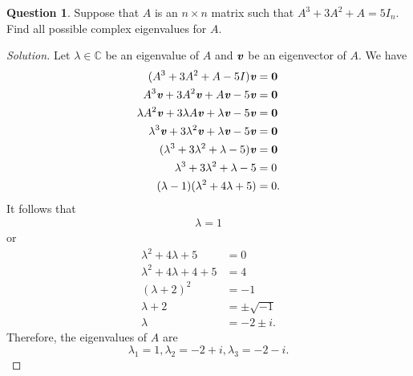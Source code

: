 \documentclass{article}
\newcommand{\C}{\mathbb{C}}
\theoremstyle{definition}
\newtheorem{question}{Question}
\newcommand{\vt}[1]{\textbf{\textit{#1}}}
\newcommand{\0}{\textbf{0}}
\begin{document}
\vspace{.75cm}

\label{Question 4}


\begin{question} Suppose that $A$ is an $n\times n$ matrix such that $A^3 + 3A^2 + A = 5I_n$. Find all possible complex eigenvalues for $A$.

\begin{proof}[Solution]
    Let \(\lambda\in\C\) be an eigenvalue of \(A\) and \(\vt{v}\) be an eigenvector of \(A\).
    We have
    \begin{align*}
        (A^3+3A^2+A-5I)\vt{v} &= \0 \\
        A^3\vt{v}+3A^2\vt{v}+A\vt{v}-5\vt{v} &= \0 \\
        \lambda A^2\vt{v}+3\lambda A\vt{v}+\lambda\vt{v}-5\vt{v} &= \0 \\
        \lambda^3\vt{v}+3\lambda^2\vt{v}+\lambda\vt{v}-5\vt{v} &= \0 \\
        (\lambda^3+3\lambda^2+\lambda-5)\vt{v} &= \0 \\
        \lambda^3+3\lambda^2+\lambda-5 &= 0 \\
        (\lambda-1)(\lambda^2+4\lambda+5) &= 0.
    \end{align*} It follows that
    \begin{align*}
        \lambda = 1
    \end{align*} or
    \begin{align*}
        \lambda^2+4\lambda+5 &= 0 \\
        \lambda^2+4\lambda+4+5 &= 4 \\
        (\lambda+2)^2 &= -1 \\
        \lambda+2 &= \pm\sqrt{-1} \\
        \lambda &= -2\pm i.
    \end{align*}
    Therefore, the eigenvalues of \(A\) are
    \[\lambda_1=1, \lambda_2=-2+i,\lambda_3=-2-i.\]
\end{proof}

\end{question}




\vspace{.75cm}

\label{Question 5}

\end{document}
